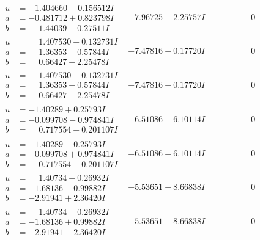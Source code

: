 \documentclass[1p]{elsarticle_modified}
\theoremstyle{definition}
\begin{document}
$$\begin{array}{c|c|c}
\begin{aligned}
u &= -1.404660 - 0.156512 I \\
a &= -0.481712 + 0.823798 I \\
b &= \phantom{-}1.44039 - 0.27511 I\end{aligned}
 & -7.96725 - 2.25757 I & \phantom{-0.000000 } 0 \\ \hline\begin{aligned}
u &= \phantom{-}1.407530 + 0.132731 I \\
a &= \phantom{-}1.36353 - 0.57844 I \\
b &= \phantom{-}0.66427 - 2.25478 I\end{aligned}
 & -7.47816 + 0.17720 I & \phantom{-0.000000 } 0 \\ \hline\begin{aligned}
u &= \phantom{-}1.407530 - 0.132731 I \\
a &= \phantom{-}1.36353 + 0.57844 I \\
b &= \phantom{-}0.66427 + 2.25478 I\end{aligned}
 & -7.47816 - 0.17720 I & \phantom{-0.000000 } 0 \\ \hline\begin{aligned}
u &= -1.40289 + 0.25793 I \\
a &= -0.099708 - 0.974841 I \\
b &= \phantom{-}0.717554 + 0.201107 I\end{aligned}
 & -6.51086 + 6.10114 I & \phantom{-0.000000 } 0 \\ \hline\begin{aligned}
u &= -1.40289 - 0.25793 I \\
a &= -0.099708 + 0.974841 I \\
b &= \phantom{-}0.717554 - 0.201107 I\end{aligned}
 & -6.51086 - 6.10114 I & \phantom{-0.000000 } 0 \\ \hline\begin{aligned}
u &= \phantom{-}1.40734 + 0.26932 I \\
a &= -1.68136 - 0.99882 I \\
b &= -2.91941 + 2.36420 I\end{aligned}
 & -5.53651 - 8.66838 I & \phantom{-0.000000 } 0 \\ \hline\begin{aligned}
u &= \phantom{-}1.40734 - 0.26932 I \\
a &= -1.68136 + 0.99882 I \\
b &= -2.91941 - 2.36420 I\end{aligned}
 & -5.53651 + 8.66838 I & \phantom{-0.000000 } 0\\

\end{array}$$
\end{document}
